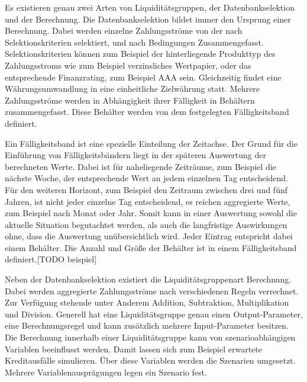 Es existieren genau zwei Arten von Liquiditätsgruppen, der Datenbankselektion und der Berechnung. Die Datenbankselektion bildet immer den Ursprung einer Berechnung. Dabei werden einzelne Zahlungsströme von der nach Selektionskriterien selektiert, und nach Bedingungen Zusammengefasst. Selektionskriterien können zum Beispiel der hinterliegende Produkttyp des Zahlungsstroms wie zum Beispiel verzinsliches Wertpapier, oder das entsprechende Finanzrating, zum Beispiel AAA sein. Gleichzeitig findet eine Währungsumwandlung in eine einheitliche Zielwährung statt. Mehrere Zahlungsströme werden in Abhängigkeit ihrer Fälligkeit in Behältern zusammengefasst. Diese Behälter werden von dem festgelegten Fälligkeitsband definiert.

Ein Fälligkeitsband ist eine spezielle Einteilung der Zeitachse. Der Grund für die Einführung von Fälligkeitsbändern liegt in der späteren Auswertung der berechneten Werte. Dabei ist für naheliegende Zeiträume, zum Beispiel die nächste Woche, der entsprechende Wert an jedem einzelnen Tag entscheidend. Für den weiteren Horizont, zum Beispiel den Zeitraum zwischen drei und fünf Jahren, ist nicht jeder einzelne Tag  entscheidend, es reichen aggregierte Werte, zum Beispiel nach Monat oder Jahr. Somit kann in einer Auswertung sowohl die aktuelle Situation begutachtet werden, als auch die langfristige Auswirkungen ohne, dass die Auswertung unübersichtlich wird. Jeder Eintrag entspricht dabei einem Behälter. Die Anzahl und Größe der Behälter ist in einem Fälligkeitsband definiert.[TODO beispiel]

Neben der Datenbankselektion existiert die Liquiditätsgruppenart Berechnung. Dabei werden aggregierte Zahlungsströme nach verschiedenen Regeln verrechnet. Zur Verfügung stehende unter Anderem Addition, Subtraktion, Multiplikation und Division. Generell hat eine Liquiditätsgruppe genau einen Output-Parameter, eine Berechnungsregel und kann zusätzlich mehrere Input-Parameter besitzen. Die Berechnung innerhalb einer Liquiditätsgruppe kann von szenarioabhängigen Variablen beeinflusst werden. Damit lassen sich zum Beispiel erwartete Kreditausfälle simulieren. Über diese Variablen werden die Szenarien umgesetzt. Mehrere Variablenausprägungen legen ein Szenario fest.

